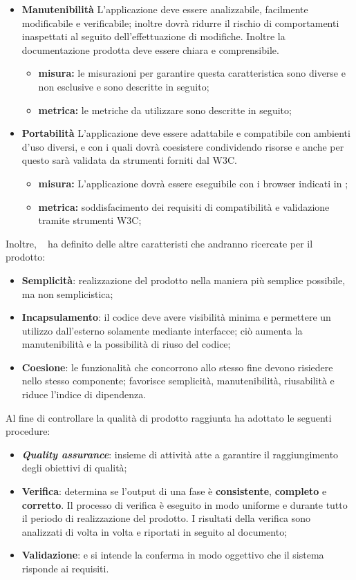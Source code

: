 \begin{itemize}
\item \textbf{Manutenibilità}
L’applicazione deve essere analizzabile, facilmente modificabile e verificabile; inoltre dovrà ridurre il rischio di comportamenti inaspettati al seguito dell'effettuazione di modifiche. Inoltre la documentazione prodotta deve essere chiara e comprensibile.
\begin{itemize}
\item \textbf{misura:} le misurazioni per garantire questa caratteristica sono diverse e non esclusive e sono descritte in seguito;
\item \textbf{metrica:} le metriche da utilizzare sono descritte in seguito;
\end{itemize}

\item \textbf{Portabilità}
L’applicazione deve essere adattabile e compatibile con ambienti d’uso diversi, e con i quali dovrà coesistere condividendo risorse e anche per questo sarà validata da strumenti forniti dal W3C.
\begin{itemize}
\item \textbf{misura:} L'applicazione dovrà essere eseguibile con i browser indicati in \infoAR;
\item \textbf{metrica:} soddisfacimento dei requisiti di compatibilità e validazione tramite strumenti W3C;
\end{itemize}
\end{itemize}
Inoltre, \gruppo ~ ha definito delle altre caratteristi che andranno ricercate per il prodotto:
\begin{itemize}

\item \textbf{Semplicità}: realizzazione del prodotto nella maniera più semplice possibile, ma non semplicistica;
\item \textbf{Incapsulamento}: il codice deve avere visibilità minima e permettere un utilizzo dall’esterno solamente mediante interfacce; ciò aumenta la manutenibilità e la possibilità di riuso del codice;
\item \textbf{Coesione}: le funzionalità che concorrono allo stesso fine devono risiedere nello stesso componente; favorisce semplicità, manutenibilità, riusabilità e riduce l’indice di dipendenza.
\end{itemize}
Al fine di controllare la qualità di prodotto raggiunta \gruppo ha adottato le seguenti procedure:
\begin{itemize}
\item \textbf{\textit{Quality assurance}}: insieme di attività atte a garantire il raggiungimento degli obiettivi di qualità;
\item \textbf{Verifica}: determina se l'output di una fase è \textbf{consistente}, \textbf{completo} e \textbf{corretto}. Il processo di verifica è eseguito in modo uniforme e durante tutto il periodo di realizzazione del prodotto. I risultati della verifica sono analizzati di volta in volta e riportati in seguito al documento;
\item \textbf{Validazione}: e si intende la conferma in modo oggettivo che il sistema risponde ai requisiti.
\end{itemize}
